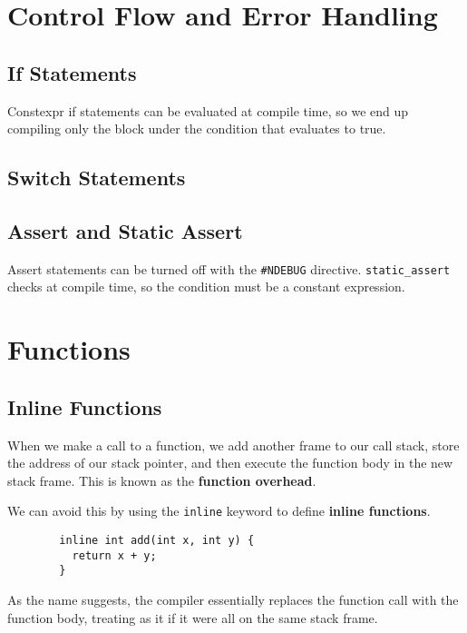 \documentclass{article}
\begin{document}
\section{Control Flow and Error Handling}  

  \subsection{If Statements} 

    Constexpr if statements can be evaluated at compile time, so we end up compiling only the block under the condition that evaluates to true.  

  \subsection{Switch Statements}

  \subsection{Assert and Static Assert} 

    Assert statements can be turned off with the \texttt{\#NDEBUG} directive. \texttt{static\_assert} checks at compile time, so the condition must be a constant expression. 

\section{Functions} 
  
  \subsection{Inline Functions} 

    When we make a call to a function, we add another frame to our call stack, store the address of our stack pointer, and then execute the function body in the new stack frame. This is known as the \textbf{function overhead}. 

    \begin{definition}
      We can avoid this by using the \texttt{inline} keyword to define \textbf{inline functions}. 
      \begin{lstlisting}
        inline int add(int x, int y) {
          return x + y; 
        }
      \end{lstlisting}
      As the name suggests, the compiler essentially replaces the function call with the function body, treating as it if it were all on the same stack frame. 
    \end{definition}
\end{document}
